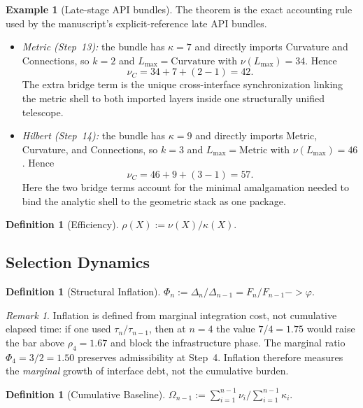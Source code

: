 \documentclass[11pt,a4paper]{article}
\def\to{->}%
\theoremstyle{plain}
\theoremstyle{definition}
\newtheorem{definition}[theorem]{Definition}
\newtheorem{example}[theorem]{Example}
\theoremstyle{remark}
\newtheorem{remark}[theorem]{Remark}
\begin{document}
\begin{example}[Late-stage API bundles]
\label{ex:telescopic-elimination}
The theorem is the exact accounting rule used by the manuscript's explicit-reference late API bundles.
\begin{itemize}[nosep]
    \item \emph{Metric (Step~13):} the bundle has $\kappa=7$ and directly imports Curvature and Connections, so $k=2$ and $L_{\max}=\mathrm{Curvature}$ with $\nu(L_{\max})=34$.  Hence
    \[
      \nu_C = 34 + 7 + (2-1) = 42.
    \]
    The extra bridge term is the unique cross-interface synchronization linking the metric shell to both imported layers inside one structurally unified telescope.
    \item \emph{Hilbert (Step~14):} the bundle has $\kappa=9$ and directly imports Metric, Curvature, and Connections, so $k=3$ and $L_{\max}=\mathrm{Metric}$ with $\nu(L_{\max})=46$.  Hence
    \[
      \nu_C = 46 + 9 + (3-1) = 57.
    \]
    Here the two bridge terms account for the minimal amalgamation needed to bind the analytic shell to the geometric stack as one package.
\end{itemize}
\end{example}

\begin{definition}[Efficiency]
\label{def:efficiency}
$\rho(X) := \nu(X) / \kappa(X)$.
\end{definition}

\subsection{Selection Dynamics}

\begin{definition}[Structural Inflation]
\label{def:inflation}
$\Phi_n := \Delta_n / \Delta_{n-1} = F_n/F_{n-1} \to \varphi$.
\end{definition}

\begin{remark}
\label{rem:phi-not-tau}
Inflation is defined from marginal integration cost, not cumulative elapsed time: if one used $\tau_n / \tau_{n-1}$, then at $n = 4$ the value $7/4 = 1.75$ would raise the bar above $\rho_4 = 1.67$ and block the infrastructure phase. The marginal ratio $\Phi_4 = 3/2 = 1.50$ preserves admissibility at Step~4. Inflation therefore measures the \emph{marginal} growth of interface debt, not the cumulative burden.
\end{remark}

\begin{definition}[Cumulative Baseline]
\label{def:omega}
$\Omega_{n-1} := \sum_{i=1}^{n-1} \nu_i / \sum_{i=1}^{n-1} \kappa_i$.
\end{definition}
\end{document}
